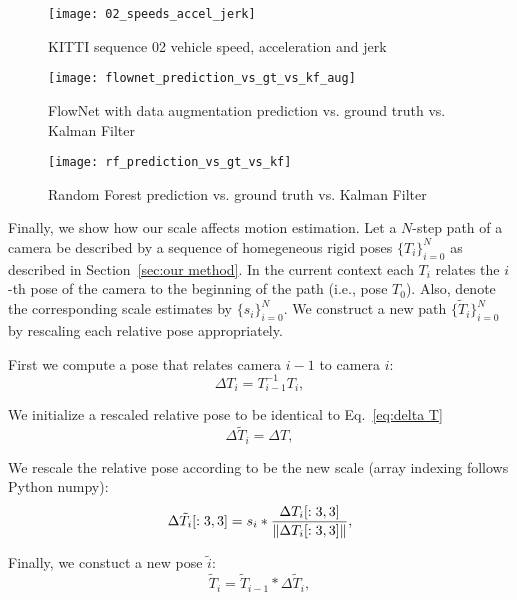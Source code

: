 \begin{figure}[!ht]
  \centering
  \texttt{[image: 02\_speeds\_accel\_jerk]}
  \caption{KITTI sequence 02 vehicle speed, acceleration and jerk}
  \label{fig:02 stats}
\end{figure}

\begin{figure}[!ht]
  \centering
  \texttt{[image: flownet\_prediction\_vs\_gt\_vs\_kf\_aug]}
  \caption{FlowNet with data augmentation prediction vs. ground truth vs. Kalman Filter}
  \label{fig:pred_vs_gt_vs_ekf_aug}
\end{figure}

\begin{figure}[!ht]
  \centering
  \texttt{[image: rf\_prediction\_vs\_gt\_vs\_kf]}
  \caption{Random Forest prediction vs. ground truth vs. Kalman Filter}
  \label{fig:rf_pred_vs_gt_vs_ekf}
\end{figure}

Finally, we show how our scale affects motion estimation.  Let a
$N$-step path of a camera be described by a sequence of homegeneous
rigid poses $\{T_i\}_{i=0}^N$ as described in Section~\ref{sec:our
  method}.  In the current context each $T_i$ relates the $i$-th pose
of the camera to the beginning of the path (i.e., pose $T_0$).  Also,
denote the corresponding scale estimates by $\{s_i\}_{i=0}^N$.  We
construct a new path $\{\tilde{T}_i\}_{i=0}^N$ by rescaling each
relative pose appropriately.

First we compute a pose that relates camera $i-1$ to camera $i$:
\begin{equation}\label{eq:delta T}
  \Delta T_i = T_{i-1}^{-1}T_i,
\end{equation}

We initialize a rescaled relative pose to be identical to Eq.~\ref{eq:delta T}
\begin{equation}
  \Delta \tilde{T}_i = \Delta T,
\end{equation}

We rescale the relative pose according to be the new scale (array
indexing follows Python numpy):
\begin{equation}
  \Delta \tilde{T}_i[:3,3] = s_i * \frac{\Delta T_i[:3,3]}{\lVert\Delta T_i[:3,3]\rVert},
\end{equation}

Finally, we constuct a new pose $\tilde{i}$:
\begin{equation}
  \tilde{T}_i = \tilde{T}_{i-1} * \Delta \tilde{T}_i,
\end{equation}

